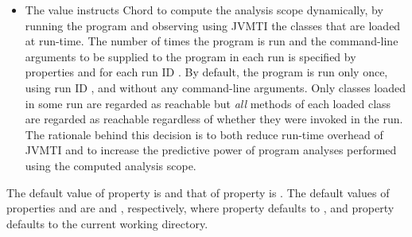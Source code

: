 \begin{itemize}
\begin{itemize}
\item
The  value instructs Chord to compute the analysis scope dynamically, by running the program
and observing using JVMTI the classes that are loaded at run-time.
The number of times the program is run and the command-line arguments to be supplied to
the program in each run is specified by properties  and
 for each run ID .  By default, the program is run only once, using run ID ,
and without any command-line arguments.
Only classes loaded in some run are regarded as reachable but {\it all} methods of each loaded class are regarded
as reachable regardless of whether they were invoked in the run.
The rationale behind this decision is to both reduce run-time overhead of JVMTI and to increase the
predictive power of program analyses performed using the computed analysis scope.
\end{itemize}
\end{itemize}

The default value of property  is  and that of
property  is .
The default values of properties  and  are
 and , respectively,
where property  defaults to ,
and property  defaults to the current working directory.

